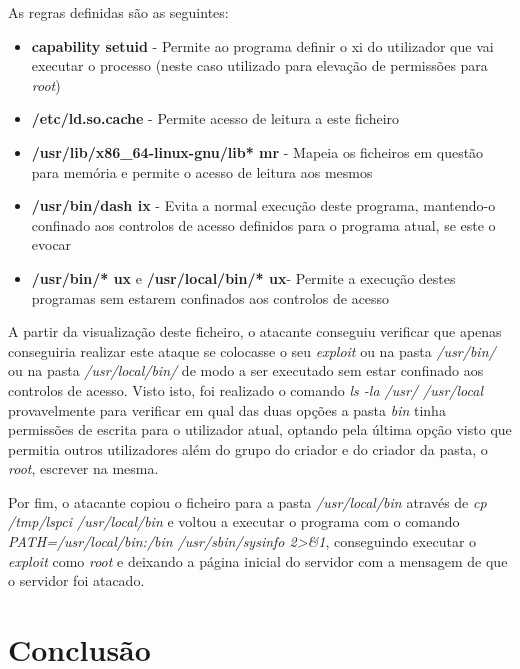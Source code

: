 \documentclass[10pt,english]{article}
\begin{document}
\par As regras definidas são as seguintes:

\begin{itemize}
    \item \textbf{capability setuid} - Permite ao programa definir o xi do utilizador que vai executar o processo (neste caso utilizado para elevação de permissões para \textit{root})

    \item \textbf{/etc/ld.so.cache} - Permite acesso de leitura a este ficheiro

    \item \textbf{/usr/lib/x86\_64-linux-gnu/lib* mr} - Mapeia os ficheiros em questão para memória e permite o acesso de leitura aos mesmos

    \item \textbf{/usr/bin/dash ix} - Evita a normal execução deste programa, mantendo-o confinado aos controlos de acesso definidos para o programa atual, se este o evocar

    \item \textbf{/usr/bin/* ux} e  \textbf{/usr/local/bin/* ux}- Permite a execução destes programas sem estarem confinados aos controlos de acesso
\end{itemize}

\par A partir da visualização deste ficheiro, o atacante conseguiu verificar que apenas conseguiria realizar este ataque se colocasse o seu \textit{exploit} ou na pasta \textit{/usr/bin/} ou na pasta \textit{/usr/local/bin/} de modo a ser executado sem estar confinado aos controlos de acesso. Visto isto, foi realizado o comando \textit{ls -la /usr/ /usr/local} provavelmente para verificar em qual das duas opções a pasta \textit{bin} tinha permissões de escrita para o utilizador atual, optando pela última opção visto que permitia outros utilizadores além do grupo do criador e do criador da pasta, o \textit{root}, escrever na mesma.

\par Por fim, o atacante copiou o ficheiro para a pasta \textit{/usr/local/bin} através de \textit{cp /tmp/lspci /usr/local/bin} e voltou a executar o programa com o comando \textit{PATH=/usr/local/bin:/bin /usr/sbin/sysinfo 2>&1}, conseguindo executar o \textit{exploit} como \textit{root} e deixando a página inicial do servidor com a mensagem de que o servidor foi atacado.


\clearpage

\section{Conclusão}
\end{document}

